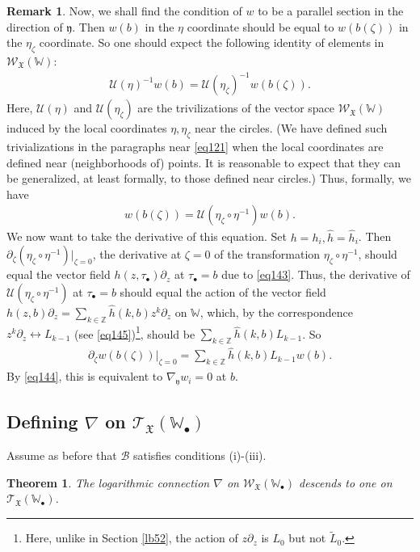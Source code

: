 \documentclass[12pt,b5paper,notitlepage]{report}
\theoremstyle{definition}
\newtheorem{rem}[df]{Remark}
\theoremstyle{plain}
\newtheorem{thm}[df]{Theorem}
\newcommand{\fk}{\mathfrak}
\newcommand{\mc}{\mathcal}
\newcommand{\wtd}{\widetilde}
\newcommand{\wht}{\widehat}
\newcommand{\scr}{\mathscr}
\newcommand{\yk}{\mathfrak y}
\newcommand{\blt}{\bullet}
\newcommand{\Wbb}{\mathbb W}
\newcommand{\Zbb}{\mathbb Z}
\numberwithin{equation}{section}
\begin{document}
\begin{rem}
Now, we shall find the condition of $w$ to be a parallel section in the direction of $\yk$. Then $w(b)$ in the $\eta$ coordinate should be equal to $w(b(\zeta))$ in the $\eta_\zeta$ coordinate. So one should expect the following identity of elements in $\scr W_{\fk X}(\Wbb)$:
\begin{align*}
\mc U(\eta)^{-1}w(b)=\mc U(\eta_\zeta)^{-1}w(b(\zeta)).
\end{align*}
Here, $\mc U(\eta)$ and $\mc U(\eta_\zeta)$ are the trivilizations of the vector space $\scr W_{\fk X}(\Wbb)$ induced by the local coordinates $\eta,\eta_\zeta$ near the circles. (We have defined such trivializations in the paragraphs near \eqref{eq121} when the local coordinates are defined near (neighborhoods of) points. It is reasonable to expect that they can be generalized, at least formally, to those defined near circles.) Thus, formally, we have
\begin{align*}
w(b(\zeta))=\mc U(\eta_\zeta\circ\eta^{-1})w(b).
\end{align*}
We now want to take the derivative of this equation. Set $h=h_i,\wht h=\wht h_i$. Then $\partial_\zeta(\eta_\zeta\circ\eta^{-1})|_{\zeta=0}$, the derivative at $\zeta=0$ of the transformation $\eta_\zeta\circ\eta^{-1}$, should equal the vector field $h(z,\tau_\blt)\partial_z$ at $\tau_\blt=b$ due to \eqref{eq143}.  Thus, the derivative of $\mc U(\eta_\zeta\circ\eta^{-1})$ at $\tau_\blt=b$ should equal the action of the vector field $h(z,b)\partial_z=\sum_{k\in\Zbb}\wht h(k,b)z^k\partial_z$ on $\Wbb$, which, by the correspondence $z^k\partial_z\leftrightarrow L_{k-1}$ (see \eqref{eq145})\footnote{Here, unlike in Section \ref{lb52}, the action of $z\partial_z$ is $L_0$ but not $\wtd L_0$.}, should be 
$\sum_{k\in\Zbb}\wht h(k,b)L_{k-1}$. So
\begin{align*}
\partial_\zeta w(b(\zeta))\Big|_{\zeta=0}=\sum_{k\in\Zbb}\wht h(k,b)L_{k-1}w(b).
\end{align*}
By \eqref{eq144}, this is equivalent to $\nabla_{\yk}w_i=0$ at $b$.
\end{rem}



\subsection*{Defining $\nabla$ on $\scr T_{\fk X}(\Wbb_\blt)$}

Assume as before that $\mc B$ satisfies conditions (i)-(iii).
\begin{thm}
The logarithmic connection $\nabla$ on $\scr W_{\fk X}(\Wbb_\blt)$ descends to one on $\scr T_{\fk X}(\Wbb_\blt)$.
\end{thm}
\end{document}
